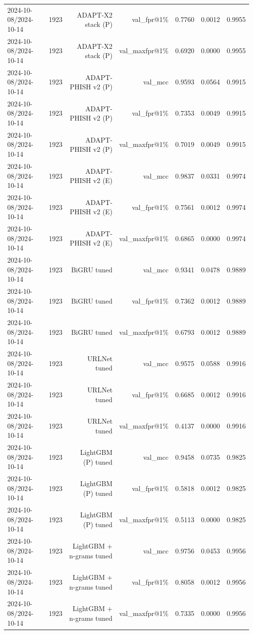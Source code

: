 \begin{table}[t]
\begin{tabular}{llrrrrr}
2024-10-08/2024-10-14 & 1923 & ADAPT-X2 stack (P) & val\_fpr@1\% & 0.7760 & 0.0012 & 0.9955 \\
2024-10-08/2024-10-14 & 1923 & ADAPT-X2 stack (P) & val\_maxfpr@1\% & 0.6920 & 0.0000 & 0.9955 \\
2024-10-08/2024-10-14 & 1923 & ADAPT-PHISH v2 (P) & val\_mcc & 0.9593 & 0.0564 & 0.9915 \\
2024-10-08/2024-10-14 & 1923 & ADAPT-PHISH v2 (P) & val\_fpr@1\% & 0.7353 & 0.0049 & 0.9915 \\
2024-10-08/2024-10-14 & 1923 & ADAPT-PHISH v2 (P) & val\_maxfpr@1\% & 0.7019 & 0.0049 & 0.9915 \\
2024-10-08/2024-10-14 & 1923 & ADAPT-PHISH v2 (E) & val\_mcc & 0.9837 & 0.0331 & 0.9974 \\
2024-10-08/2024-10-14 & 1923 & ADAPT-PHISH v2 (E) & val\_fpr@1\% & 0.7561 & 0.0012 & 0.9974 \\
2024-10-08/2024-10-14 & 1923 & ADAPT-PHISH v2 (E) & val\_maxfpr@1\% & 0.6865 & 0.0000 & 0.9974 \\
2024-10-08/2024-10-14 & 1923 & BiGRU tuned & val\_mcc & 0.9341 & 0.0478 & 0.9889 \\
2024-10-08/2024-10-14 & 1923 & BiGRU tuned & val\_fpr@1\% & 0.7362 & 0.0012 & 0.9889 \\
2024-10-08/2024-10-14 & 1923 & BiGRU tuned & val\_maxfpr@1\% & 0.6793 & 0.0012 & 0.9889 \\
2024-10-08/2024-10-14 & 1923 & URLNet tuned & val\_mcc & 0.9575 & 0.0588 & 0.9916 \\
2024-10-08/2024-10-14 & 1923 & URLNet tuned & val\_fpr@1\% & 0.6685 & 0.0012 & 0.9916 \\
2024-10-08/2024-10-14 & 1923 & URLNet tuned & val\_maxfpr@1\% & 0.4137 & 0.0000 & 0.9916 \\
2024-10-08/2024-10-14 & 1923 & LightGBM (P) tuned & val\_mcc & 0.9458 & 0.0735 & 0.9825 \\
2024-10-08/2024-10-14 & 1923 & LightGBM (P) tuned & val\_fpr@1\% & 0.5818 & 0.0012 & 0.9825 \\
2024-10-08/2024-10-14 & 1923 & LightGBM (P) tuned & val\_maxfpr@1\% & 0.5113 & 0.0000 & 0.9825 \\
2024-10-08/2024-10-14 & 1923 & LightGBM + n-grams tuned & val\_mcc & 0.9756 & 0.0453 & 0.9956 \\
2024-10-08/2024-10-14 & 1923 & LightGBM + n-grams tuned & val\_fpr@1\% & 0.8058 & 0.0012 & 0.9956 \\
2024-10-08/2024-10-14 & 1923 & LightGBM + n-grams tuned & val\_maxfpr@1\% & 0.7335 & 0.0000 & 0.9956 \\

\end{tabular}
\end{table}
